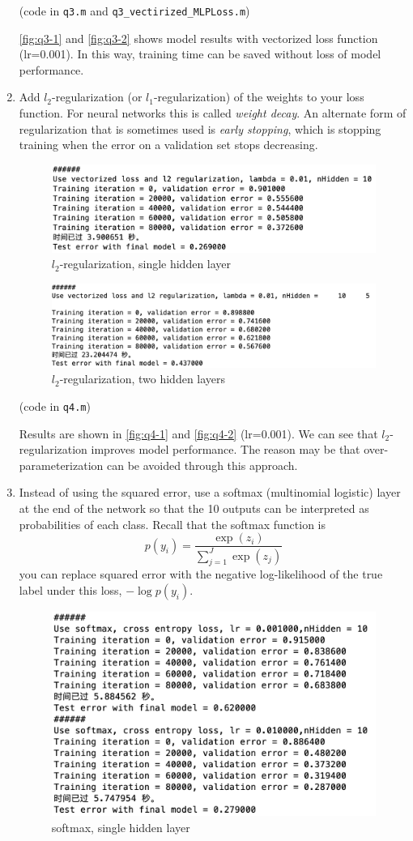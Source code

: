 \documentclass[10pt]{article}
\begin{document}
\begin{enumerate}
(code in \texttt{q3.m} and \texttt{q3\_vectirized\_MLPLoss.m})

\autoref{fig:q3-1} and \autoref{fig:q3-2} shows model results with vectorized loss function (lr=0.001). In this way, training time can be saved without loss of model performance.

\item Add $l_2$-regularization (or $l_1$-regularization) of the weights to your loss function. For neural networks this is called \textit{weight decay}. An alternate form of regularization that is sometimes used is \textit{early stopping}, which is stopping training when the error on a validation set stops decreasing.

\begin{figure}[htbp]
  \centering
  \includegraphics[width=0.5\linewidth]{figures/q4-1.png}
  \caption{$l_2$-regularization, single hidden layer}
  \label{fig:q4-1}
\end{figure}

\begin{figure}[htbp]
  \centering
  \includegraphics[width=0.5\linewidth]{figures/q4-2.png}
  \caption{$l_2$-regularization, two hidden layers}
  \label{fig:q4-2}
\end{figure}

(code in \texttt{q4.m})

Results are shown in \autoref{fig:q4-1} and \autoref{fig:q4-2} (lr=0.001). We can see that $l_2$-regularization improves model performance. The reason may be that over-parameterization can be avoided through this approach.

\item Instead of using the squared error, use a softmax (multinomial logistic) layer at the end of the network so that the 10 outputs can be interpreted as probabilities of each class. Recall that the softmax function is
$$
p(y_i) = \frac{\exp(z_i)}{\sum_{j=1}^J\exp(z_j)}
$$
you can replace squared error with the negative log-likelihood of the true label under this loss, $-\log p(y_i)$.

\begin{figure}[htbp]
  \centering
  \includegraphics[width=0.5\linewidth]{figures/q5-1.png}
  \caption{softmax, single hidden layer}
  \label{fig:q5-1}
\end{figure}


\end{enumerate}
\end{document}
